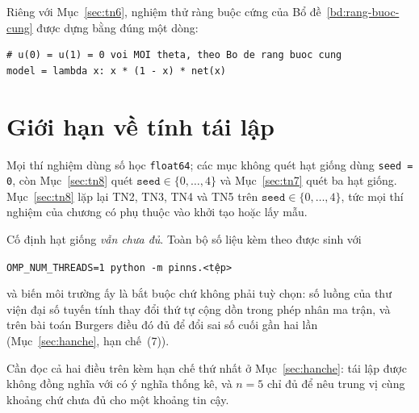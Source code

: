 Riêng với Mục~\ref{sec:tn6}, nghiệm thử ràng buộc cứng của
Bổ đề~\ref{bd:rang-buoc-cung} được dựng bằng đúng một dòng:

\begin{lstlisting}[caption={Nghiệm thử thoả điều kiện biên theo cấu trúc.},label={lst:hard}]
# u(0) = u(1) = 0 voi MOI theta, theo Bo de rang buoc cung
model = lambda x: x * (1 - x) * net(x)
\end{lstlisting}

\section{Giới hạn về tính tái lập}

Mọi thí nghiệm dùng số học \texttt{float64}; các mục không quét hạt giống dùng
\texttt{seed = 0}, còn Mục~\ref{sec:tn8} quét $\texttt{seed} \in \{0,\dots,4\}$
và Mục~\ref{sec:tn7} quét ba hạt giống. Mục~\ref{sec:tn8} lặp lại TN2, TN3, TN4
và TN5 trên $\texttt{seed} \in \{0,\dots,4\}$, tức mọi thí nghiệm của chương có
phụ thuộc vào khởi tạo hoặc lấy mẫu.

Cố định hạt giống \emph{vẫn chưa đủ}. Toàn bộ số liệu kèm theo được sinh với
\begin{center}
\texttt{OMP\_NUM\_THREADS=1 python -m pinns.<tệp>}
\end{center}
và biến môi trường ấy là bắt buộc chứ không phải tuỳ chọn: số luồng của thư viện
đại số tuyến tính thay đổi thứ tự cộng dồn trong phép nhân ma trận, và trên bài
toán Burgers điều đó đủ để đổi sai số cuối gần hai lần
(Mục~\ref{sec:hanche}, hạn chế~(7)).

Cần đọc cả hai điều trên kèm hạn chế thứ nhất ở Mục~\ref{sec:hanche}: tái lập
được không đồng nghĩa với có ý nghĩa thống kê, và $n = 5$ chỉ đủ để nêu trung vị
cùng khoảng chứ chưa đủ cho một khoảng tin cậy.
